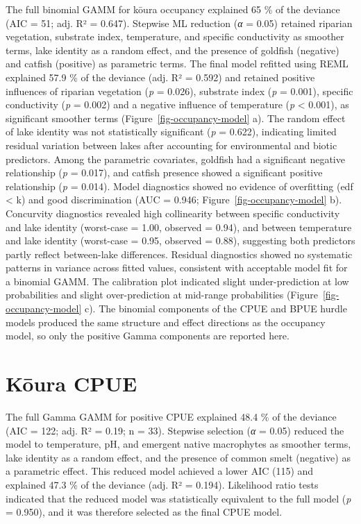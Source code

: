 \documentclass[
  12pt,
  a4paper,
]{scrbook}
\begin{document}
The full binomial GAMM for kōura occupancy explained 65 \% of the
deviance (AIC = 51; adj. R² = 0.647). Stepwise ML reduction (\emph{α} =
0.05) retained riparian vegetation, substrate index, temperature, and
specific conductivity as smoother terms, lake identity as a random
effect, and the presence of goldfish (negative) and catfish (positive)
as parametric terms. The final model refitted using REML explained 57.9
\% of the deviance (adj. R² = 0.592) and retained positive influences of
riparian vegetation (\emph{p} = 0.026), substrate index (\emph{p} =
0.001), specific conductivity (\emph{p} = 0.002) and a negative
influence of temperature (\emph{p} \textless{} 0.001), as significant
smoother terms (Figure~\ref{fig-occupancy-model} a). The random effect
of lake identity was not statistically significant (\emph{p} = 0.622),
indicating limited residual variation between lakes after accounting for
environmental and biotic predictors. Among the parametric covariates,
goldfish had a significant negative relationship (\emph{p} = 0.017), and
catfish presence showed a significant positive relationship (\emph{p} =
0.014). Model diagnostics showed no evidence of overfitting (edf
\textless{} k) and good discrimination (AUC = 0.946;
Figure~\ref{fig-occupancy-model} b). Concurvity diagnostics revealed
high collinearity between specific conductivity and lake identity
(worst-case = 1.00, observed = 0.94), and between temperature and lake
identity (worst-case = 0.95, observed = 0.88), suggesting both
predictors partly reflect between-lake differences. Residual diagnostics
showed no systematic patterns in variance across fitted values,
consistent with acceptable model fit for a binomial GAMM. The
calibration plot indicated slight under-prediction at low probabilities
and slight over-prediction at mid-range probabilities
(Figure~\ref{fig-occupancy-model} c). The binomial components of the
CPUE and BPUE hurdle models produced the same structure and effect
directions as the occupancy model, so only the positive Gamma components
are reported here.

\section{Kōura CPUE}\label{kux14dura-cpue}

The full Gamma GAMM for positive CPUE explained 48.4 \% of the deviance
(AIC = 122; adj. R² = 0.19; n = 33). Stepwise selection (\emph{α} =
0.05) reduced the model to temperature, pH, and emergent native
macrophytes as smoother terms, lake identity as a random effect, and the
presence of common smelt (negative) as a parametric effect. This reduced
model achieved a lower AIC (115) and explained 47.3 \% of the deviance
(adj. R² = 0.194). Likelihood ratio tests indicated that the reduced
model was statistically equivalent to the full model (\emph{p} = 0.950),
and it was therefore selected as the final CPUE model.
\end{document}
